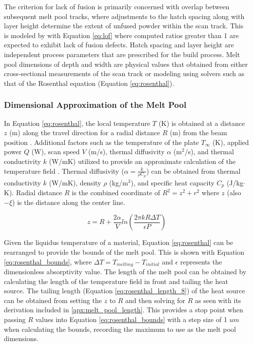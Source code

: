 The criterion for lack of fusion is primarily concerned with overlap between
subsequent melt pool tracks, where adjustments to the hatch spacing along with
layer height determine the extent of unfused powder within the scan track.
\cite{gordon_defect_2020, tang_prediction_2017} This is modeled by with Equation
\ref{eq:lof} \cite{tang_prediction_2017, gordon_defect_2020,
pak_additivellm_2025} where computed ratios greater than 1 are expected to
exhibit lack of fusion defects. Hatch spacing and layer height are independent
process parameters that are prescribed for the build process. Melt pool
dimensions of depth and width are physical values that obtained from either
cross-sectional measurements of the scan track \cite{aboulkhair_formation_2016}
or modeling using solvers such as that of the Rosenthal \cite{tang_rapid_2016,
tang_prediction_2017, rosenthal_theory_2022} equation (Equation
\ref{eq:rosenthal}). 

\subsubsection{Dimensional Approximation of the Melt Pool}

In Equation \ref{eq:rosenthal}, the local temperature $T$ (K) is obtained at a
distance $z$ (m) along the travel direction for a radial distance $R$ (m) from
the beam position \cite{tang_rapid_2016, rosenthal_theory_2022}. Additional
factors such as the temperature of the plate $T_\infty$ (K), applied power $Q$
(W), scan speed $V$ (m/s), thermal diffusivity $\alpha$ ($\text{m}^2$/s), and
thermal conductivity $k$ (W/mK) utilized to provide an approximate calculation
of the temperature field \cite{tang_rapid_2016, rosenthal_theory_2022}. Thermal
diffusivity ($\alpha = \frac{k}{\rho C_p}$) can be obtained from thermal
conductivity $k$ (W/mK), density $\rho$ (kg/$\text{m}^3$), and specific heat
capacity $C_p$ (J/kg$\cdot$K). Radial distance $R$ is the combined coordinate of
$R^2 = z^2 + r^2$ where $z$ (also $-\xi$) is the distance along the center line.

\begin{equation}
z = R + \frac{2 \alpha}{V}ln\left(\frac{2 \pi k R \Delta T}{\epsilon P}\right)
\label{eq:rosenthal_bounds}
\end{equation}

Given the liquidus temperature of a material, Equation \ref{eq:rosenthal} can be
rearranged to provide the bounds of the melt pool. This is shown with Equation
\ref{eq:rosenthal_bounds}, where $\Delta T = T_{melting} - T_{initial}$ and
$\epsilon$ represents the dimensionless absorptivity value. The length of the
melt pool can be obtained by calculating the length of the temperature field in
front and tailing the heat source. The tailing length (Equation
\ref{eq:rosenthal_length_8}) of the heat source can be obtained from setting the
$z$ to $R$ and then solving for $R$ as seen with its derivation included in
\ref{apx:melt_pool_length}. This provides a stop point when passing $R$ values
into Equation \ref{eq:rosenthal_bounds} with a step size of 1 $um$ when
calculating the bounds, recording the maximum to use as the melt pool
dimensions.

